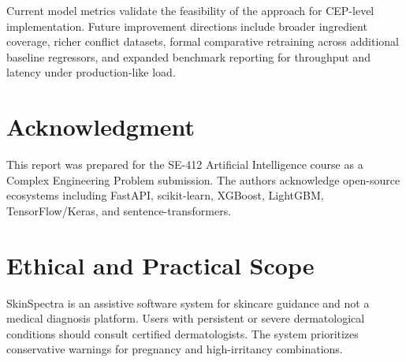 \documentclass[a4paper,fleqn]{cas-sc}
\begin{document}
Current model metrics validate the feasibility of the approach for CEP-level implementation. Future improvement directions include broader ingredient coverage, richer conflict datasets, formal comparative retraining across additional baseline regressors, and expanded benchmark reporting for throughput and latency under production-like load.

\section{Acknowledgment}\label{sec:ack}
This report was prepared for the SE-412 Artificial Intelligence course as a Complex Engineering Problem submission. The authors acknowledge open-source ecosystems including FastAPI, scikit-learn, XGBoost, LightGBM, TensorFlow/Keras, and sentence-transformers.




\clearpage %




\section{Ethical and Practical Scope}\label{sec:scope}
SkinSpectra is an assistive software system for skincare guidance and not a medical diagnosis platform. Users with persistent or severe dermatological conditions should consult certified dermatologists. The system prioritizes conservative warnings for pregnancy and high-irritancy combinations.
\end{document}
